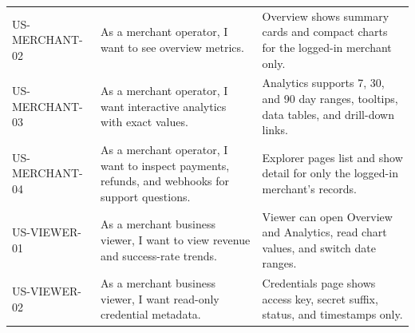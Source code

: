 \begin{longtable}{L{0.17\textwidth}L{0.37\textwidth}L{0.36\textwidth}}
\bodyrowrule
US-MERCHANT-02 & As a merchant operator, I want to see overview metrics. & Overview shows summary cards and compact charts for the logged-in merchant only. \\
\bodyrowrule
US-MERCHANT-03 & As a merchant operator, I want interactive analytics with exact values. & Analytics supports 7, 30, and 90 day ranges, tooltips, data tables, and drill-down links. \\
\bodyrowrule
US-MERCHANT-04 & As a merchant operator, I want to inspect payments, refunds, and webhooks for support questions. & Explorer pages list and show detail for only the logged-in merchant's records. \\
\bodyrowrule
US-VIEWER-01 & As a merchant business viewer, I want to view revenue and success-rate trends. & Viewer can open Overview and Analytics, read chart values, and switch date ranges. \\
\bodyrowrule
US-VIEWER-02 & As a merchant business viewer, I want read-only credential metadata. & Credentials page shows access key, secret suffix, status, and timestamps only. \\
\bottomrule
\end{longtable}
